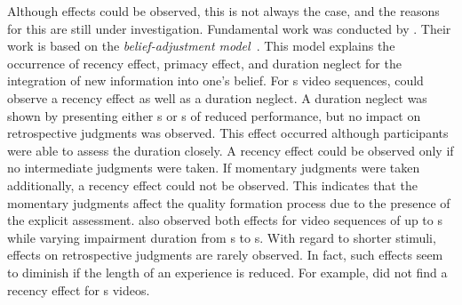 Although effects could be observed, this is not always the case, and the reasons for this are still under investigation.
Fundamental work was conducted by \citet{hands_recency_2001}.
Their work is based on the \emph{belief-adjustment model}~\citep{hogarth_order_1992}.
This model explains the occurrence of recency effect, primacy effect, and duration neglect for the integration of new information into one's belief. %
For \unit[30]{s} video sequences, \citet{hands_recency_2001} could observe a recency effect as well as a duration neglect.
A duration neglect was shown by presenting either \unit[5]{s} or \unit[10]{s} of reduced performance, but no impact on retrospective judgments was observed.
This effect occurred although participants were able to assess the duration closely. %
A recency effect could be observed only if no intermediate judgments were taken.
If momentary judgments were taken additionally, a recency effect could not be observed.
This indicates that the momentary judgments affect the quality formation process due to the presence of the explicit assessment.
\citet{hamberg_time-varying_1999} also observed both effects for video sequences of up to \unit[180]{s} while varying impairment duration from \unit[2]{s} to \unit[10]{s}.
With regard to shorter stimuli, effects on retrospective judgments are rarely observed.
In fact, such effects seem to diminish if the length of an experience is reduced.
For example, \citet{ninassi_considering_2009} did not find a recency effect for \unit[8]{s} videos.

